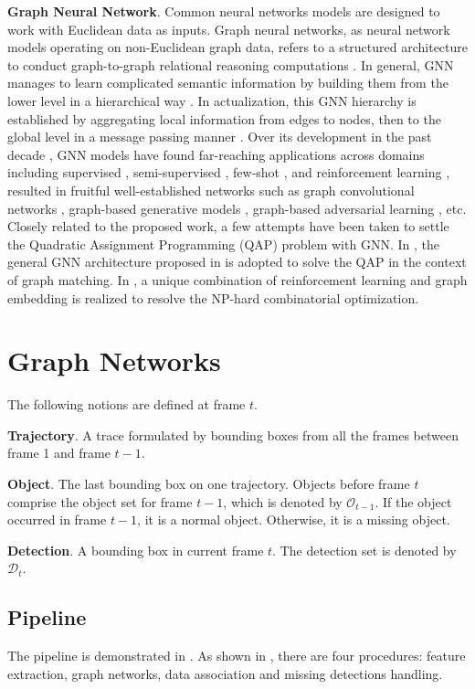 \documentclass[10pt,twocolumn,letterpaper]{article}
\begin{document}
\textbf{Graph Neural Network}. Common neural networks models are designed to work with Euclidean data as inputs. Graph neural networks, as neural network models operating on non-Euclidean graph data, refers to a structured architecture to conduct graph-to-graph relational reasoning computations \cite{GNNSurvey, DeepMindGNN}. In general, GNN manages to learn complicated semantic information by building them from the lower level in a hierarchical way \cite{DLGoodFellow}. In actualization, this GNN hierarchy is established by aggregating local information from edges to nodes, then to the global level in a message passing manner \cite{MessagePassing}. Over its development in the past decade \cite{GNNOrigin1,GNNOrigin2,GNNorigin3}, GNN models have found far-reaching applications across domains including supervised \cite{GNNSupervised}, semi-supervised \cite{Kipf2017ICLR}, few-shot \cite{GNNFewShot}, and reinforcement learning \cite{GNNReiforcement}, resulted in fruitful well-established networks such as graph convolutional networks \cite{Kipf2017ICLR, MPNN, GAT}, graph-based generative models \cite{MoIGAN, GRNN}, graph-based adversarial learning \cite{GraphSGAN, PeerNets}, etc. Closely related to the proposed work, a few attempts have been taken to settle the Quadratic Assignment Programming (QAP) problem with GNN. In \cite{GNNQAP1}, the general GNN architecture proposed in \cite{GNNorigin3} is adopted to solve the QAP in the context of graph matching. In \cite{GNNCO}, a unique combination of reinforcement learning and graph embedding is realized to resolve the NP-hard combinatorial optimization.

\section{Graph Networks}
The following notions are defined at frame $t$.

\textbf{Trajectory}. A trace formulated by bounding boxes from all the frames between frame 1 and frame $t-1$.

\textbf{Object}. The last bounding box on one trajectory. 
Objects before frame $t$ comprise the object set for frame $t-1$, which is denoted by $\mathcal{O}_{t-1}$.
If the object occurred in frame $t-1$, it is a normal object.
Otherwise, it is a missing object.

\textbf{Detection}. A bounding box in current frame $t$. 
The detection set is denoted by $\mathcal{D}_t$. 

\subsection{Pipeline}
The pipeline is demonstrated in . 
As shown in , there are four procedures: feature extraction, graph networks, data association and missing detections handling. 
\end{document}
